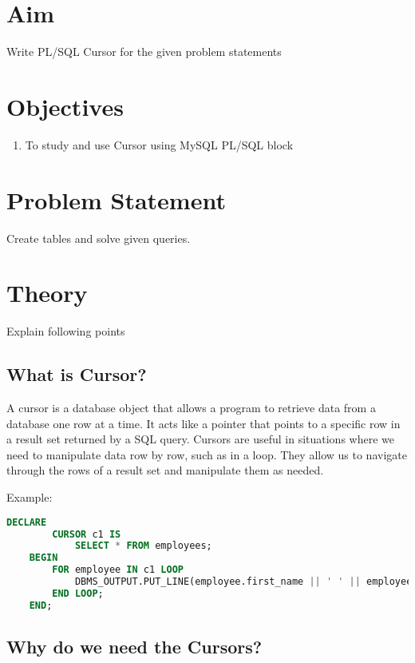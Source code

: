 \documentclass[11pt]{article}
\begin{document}
\tableofcontents
\thispagestyle{empty}
\clearpage

\setcounter{page}{1}

\section{Aim}
Write PL/SQL Cursor for the given problem statements

\section{Objectives}
\begin{enumerate}
    \item To study and use Cursor using MySQL PL/SQL block
\end{enumerate}


\section{Problem Statement}
Create tables and solve given queries.

\section{Theory}

Explain following points

\subsection{What is Cursor?}

A cursor is a database object that allows a program to retrieve data from a database one row at a time. It acts like a pointer that points to a specific row in a result set returned by a SQL query. Cursors are useful in situations where we need to manipulate data row by row, such as in a loop. They allow us to navigate through the rows of a result set and manipulate them as needed.

Example:
\begin{lstlisting}[language=sql]
    DECLARE
        CURSOR c1 IS
            SELECT * FROM employees;
    BEGIN
        FOR employee IN c1 LOOP
            DBMS_OUTPUT.PUT_LINE(employee.first_name || ' ' || employee.last_name);
        END LOOP;
    END;
\end{lstlisting}

\subsection{Why do we need the Cursors?}
\end{document}
